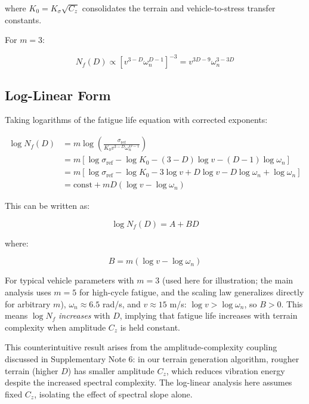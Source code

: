 \documentclass[11pt]{article}
\begin{document}
where $K_0 = K_\sigma \sqrt{C_z}$ consolidates the terrain and vehicle-to-stress transfer constants.

For $m = 3$:

\begin{equation}
N_f(D) \propto [v^{3-D} \omega_n^{D-1}]^{-3} = v^{3D-9} \omega_n^{3-3D}
\end{equation}


\subsection{Log-Linear Form}

Taking logarithms of the fatigue life equation with corrected exponents:

\begin{align}
\log N_f(D) &= m \log\left(\frac{\sigma_{\text{ref}}}{K_0 v^{3-D} \omega_n^{D-1}}\right) \\
&= m[\log \sigma_{\text{ref}} - \log K_0 - (3-D)\log v - (D-1)\log \omega_n] \\
&= m[\log \sigma_{\text{ref}} - \log K_0 - 3\log v + D\log v - D\log \omega_n + \log \omega_n] \\
&= \text{const} + mD(\log v - \log \omega_n)
\end{align}

This can be written as:

\begin{equation}
\log N_f(D) = A + BD
\end{equation}

where:

\begin{equation}
B = m(\log v - \log \omega_n)
\end{equation}

For typical vehicle parameters with $m = 3$ (used here for illustration; the main analysis uses $m = 5$ for high-cycle fatigue, and the scaling law generalizes directly for arbitrary $m$), $\omega_n \approx 6.5$ rad/s, and $v \approx 15$ m/s: $\log v > \log \omega_n$, so $B > 0$. This means $\log N_f$ \textit{increases} with $D$, implying that fatigue life increases with terrain complexity when amplitude $C_z$ is held constant. 

This counterintuitive result arises from the amplitude-complexity coupling discussed in Supplementary Note 6: in our terrain generation algorithm, rougher terrain (higher $D$) has smaller amplitude $C_z$, which reduces vibration energy despite the increased spectral complexity. The log-linear analysis here assumes fixed $C_z$, isolating the effect of spectral slope alone.
\end{document}
